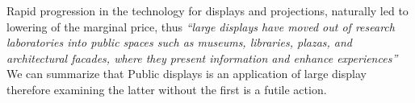 
Rapid progression in the technology for displays and projections, naturally led to lowering of the marginal price, thus \emph{``large displays have moved out of research laboratories into public spaces such as museums, libraries, plazas, and architectural facades, where they present information and enhance experiences''} \cite{Hinrichs:2013:IPD:2478559.2478965}\\

We can summarize that Public displays is an application of large display therefore examining the latter without the first is a futile action.